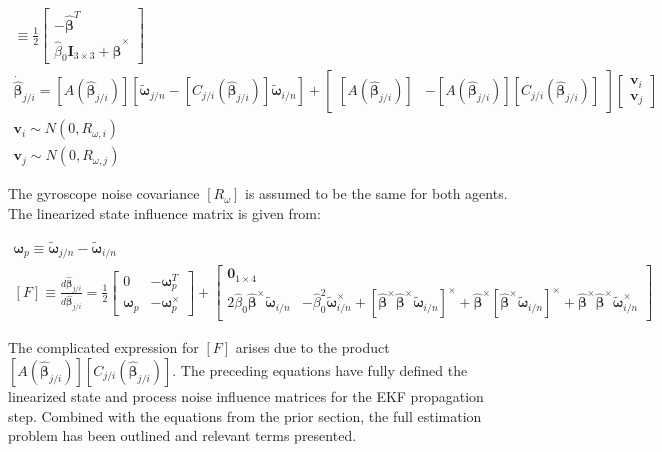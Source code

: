 \documentclass{aiaa-tc}
\newcommand{\B}[1]{\textbf{#1}} %
\newcommand{\BG}[1]{{\bm #1}}           %
\newcommand{\ddarg}[2]{\frac{d#1}{d#2}} %
\begin{document}
\begin{align}
[A(\hat{\BG{\beta}}_{j/i})] \equiv \frac{1}{2} \begin{bmatrix}
-\hat{\BG{\beta}}^T \\
\hat{\beta}_0 \B{I}_{3\times 3} + \hat{\BG{\beta}}^\times
\end{bmatrix} \\
\dot{\hat{\BG{\beta}}}_{j/i} = [A(\hat{\BG{\beta}}_{j/i})] [\tilde{\BG{\omega}}_{j/n} - [C_{j/i}(\hat{\BG{\beta}}_{j/i})] \tilde{\BG{\omega}}_{i/n}] + 
\begin{bmatrix}
[A(\hat{\BG{\beta}}_{j/i})] & -[A(\hat{\BG{\beta}}_{j/i})][C_{j/i}(\hat{\BG{\beta}}_{j/i})]
\end{bmatrix} 
\begin{bmatrix}
\B{v}_i \label{eq:quatDerivative}\\
\B{v}_j
\end{bmatrix} \\
\B{v}_i \sim N(0,R_{\omega,i}) \\
\B{v}_j \sim N(0,R_{\omega,j})
\end{align}

The gyroscope noise covariance $[R_{\omega}]$ is assumed to be the same for both agents. The linearized state influence matrix is given from:

\begin{align}
\BG{\omega}_p \equiv \tilde{\BG{\omega}}_{j/n}-\tilde{\BG{\omega}}_{i/n} \\
[F] \equiv \ddarg{\dot{\hat{\BG{\beta}}}_{j/i}}{\hat{\BG{\beta}}_{j/i}} = \frac{1}{2}
\begin{bmatrix}
0 & -\BG{\omega}_p^T \\ \BG{\omega}_p & -\BG{\omega}_p^\times
\end{bmatrix} + \begin{bmatrix}
\B{0}_{1\times 4}\\
2\hat{\beta}_0 \hat{\BG{\beta}}^\times \tilde{\BG{\omega}}_{i/n} & -\hat{\beta}_0^2 \tilde{\BG{\omega}}_{i/n}^\times + [\hat{\BG{\beta}}^\times \hat{\BG{\beta}}^\times \tilde{\BG{\omega}}_{i/n}]^\times + \hat{\BG{\beta}}^\times [\hat{\BG{\beta}}^\times \tilde{\BG{\omega}}_{i/n}]^\times + \hat{\BG{\beta}}^\times \hat{\BG{\beta}}^\times \tilde{\BG{\omega}}_{i/n}^\times 
\end{bmatrix}
\end{align}

The complicated expression for $[F]$ arises due to the product $[A(\hat{\BG{\beta}}_{j/i})][C_{j/i}(\hat{\BG{\beta}}_{j/i})]$. The preceding equations have fully defined the linearized state and process noise influence matrices for the EKF propagation step. Combined with the equations from the prior section, the full estimation problem has been outlined and relevant terms presented.
\end{document}
